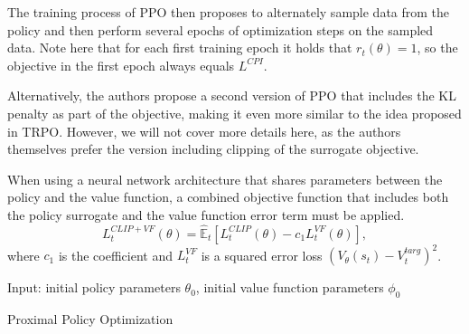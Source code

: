 The training process of PPO then proposes to alternately sample data from the policy and then perform several epochs of optimization steps on the sampled data.
Note here that for each first training epoch it holds that $r_t(\theta) = 1$, so the objective in the first epoch always equals $L^{CPI}$.

Alternatively, the authors propose a second version of PPO that includes the KL penalty as part of the objective, making it even more similar to the idea proposed in TRPO.
However, we will not cover more details here, as the authors themselves prefer the version including clipping of the surrogate objective.

When using a neural network architecture that shares parameters between the policy and the value function, a combined objective function that includes both the policy surrogate and the value function error term must be applied.
\[
  L_t^{CLIP+VF}(\theta) = \hat{\mathbb{E}}_t \left[L_t^{CLIP}(\theta) - c_1 L_t^{VF}(\theta) \right],
\]
where $c_1$ is the coefficient and $L_t^{VF}$ is a squared error loss $(V_\theta(s_t) - V_t^{targ})^2$.

\begin{algorithm}[]
  Input: initial policy parameters $\theta_0$, initial value function parameters $\phi_0$
  
  
  \caption{Proximal Policy Optimization}
  \label{PPO}
\end{algorithm}

